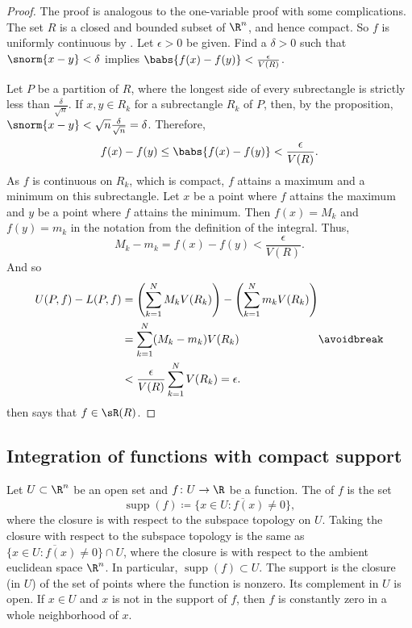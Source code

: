 \begin{proof}
The proof is analogous to the one-variable proof with some complications.
The set $R$ is a closed and bounded subset of $\R^n$, and hence compact.  So
$f$ is uniformly continuous 
by .
Let $\epsilon > 0$ be given.  Find a $\delta > 0$ such that
$\snorm{x-y} < \delta$ implies $\babs{f(x)-f(y)} < \frac{\epsilon}{V(R)}$.

Let $P$ be a partition of $R$, where the longest side of every subrectangle
is strictly less than $\frac{\delta}{\sqrt{n}}$.
If $x, y \in R_k$ for a subrectangle $R_k$ of $P$, then,
by the proposition,
$\snorm{x-y} < \sqrt{n} \frac{\delta}{\sqrt{n}} = \delta$.  Therefore,
\begin{equation*}
f(x)-f(y) \leq \babs{f(x)-f(y)} < \frac{\epsilon}{V(R)} .
\end{equation*}
As $f$ is continuous on $R_k$, which is compact, $f$ attains a maximum and a minimum
on this subrectangle.
Let $x$ be a point where $f$ attains the maximum and $y$ be a point
where $f$ attains the minimum.  Then $f(x) = M_k$
and $f(y) = m_k$ in the notation from the definition of the integral.
Thus,
\begin{equation*}
M_k-m_k = f(x)-f(y) < 
\frac{\epsilon}{V(R)} .
\end{equation*}
And so
\begin{equation*}
\begin{split}
U(P,f) - L(P,f)
& =
\left(
\sum_{k=1}^N
M_k V(R_k)
\right)
-
\left(
\sum_{k=1}^N
m_k V(R_k)
\right)
\\
& =
\sum_{k=1}^N
(M_k-m_k) V(R_k)
\\
& <
\frac{\epsilon}{V(R)}
\sum_{k=1}^N
V(R_k)
= \epsilon.
\end{split}
\avoidbreak
\end{equation*}
 then says that $f \in \sR(R)$.
\end{proof}

\subsection{Integration of functions with compact support}

Let $U \subset \R^n$ be an open set and
$f \colon U \to \R$ be a function.  The
\emph{} of $f$ is the set
\begin{equation*}
\operatorname{supp} (f) \coloneqq
\overline{
\{ x \in U : f(x) \not= 0 \}
} ,
\end{equation*}
where the closure is with respect to the subspace topology on $U$.
Taking the closure with respect to the subspace
topology is the same as 
$\overline{
\{ x \in U : f(x) \not= 0 \}
} \cap U$, where the closure is with respect to the ambient euclidean space
$\R^n$.
In particular,
$\operatorname{supp} (f) \subset U$.
The support is the closure (in $U$) of the set of points where the
function is nonzero.  Its complement in $U$ is open.
If $x \in U$ and $x$ is not in the support of $f$,
then
$f$ is constantly zero in a whole neighborhood of $x$.

